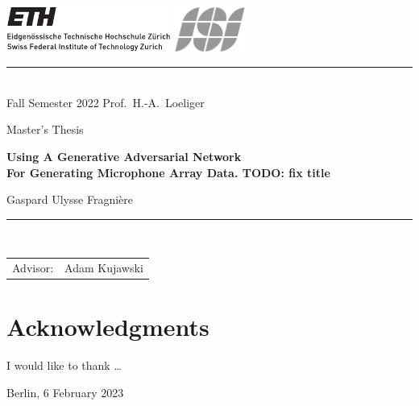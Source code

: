 \documentclass[11pt,a4paper,twoside]{report}
\begin{document}
\pagestyle{plain}
\lfoot{}
\cfoot{\thepage}
\rfoot{}
     
\begin{titlepage}
  \begin{center}
    \includegraphics[height=15mm]{resources/ethlogo} 
    \hfill
    \includegraphics[height=15mm]{resources/isilogo_plain_bw}

    \rule{\textwidth}{0.5pt}\\[1ex]
    {\Large Fall Semester 2022 \hfill 
      Prof.~H.-A.~Loeliger
    }

    \LARGE
    Master's Thesis

    \Huge\textbf{
      Using A Generative Adversarial Network\\
      For Generating Microphone Array Data. TODO: fix title
    }

    
    \LARGE{
      Gaspard Ulysse Fragnière
    }
    
  \end{center}
  \rule{\textwidth}{0.5pt}\\[2ex]
  \noindent
  \begin{tabular}{@{}ll@{}}
    \Large Advisor: & \Large Adam Kujawski\\[1ex]
  \end{tabular}
\end{titlepage}


\chapter*{Acknowledgments}
I would like to thank \ldots


\vspace{11mm}
\noindent
Berlin, 6 February 2023
\end{document}
